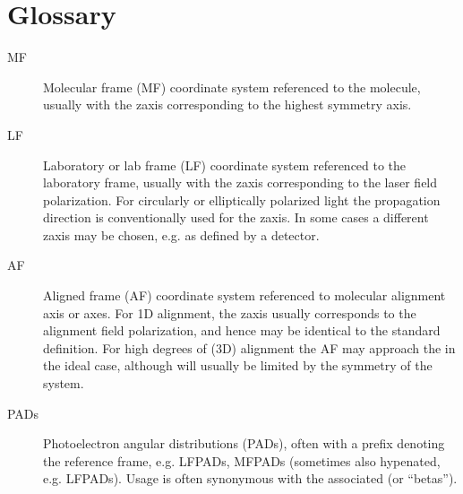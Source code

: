 \documentclass[letterpaper,table,10pt,english]{jupyterBook}
\begin{document}
\chapter{Glossary}
\label{\detokenize{backmatter/glossary:glossary}}\label{\detokenize{backmatter/glossary::doc}}\begin{description}
\item[{MF\label{\detokenize{backmatter/glossary:term-MF}}}] \leavevmode
\sphinxAtStartPar
Molecular frame (MF) \sphinxhyphen{} coordinate system referenced to the molecule, usually with the z\sphinxhyphen{}axis corresponding to the highest symmetry axis.

\item[{LF\label{\detokenize{backmatter/glossary:term-LF}}}] \leavevmode
\sphinxAtStartPar
Laboratory or lab frame (LF) \sphinxhyphen{} coordinate system referenced to the laboratory frame, usually with the z\sphinxhyphen{}axis corresponding to the laser field polarization. For circularly or elliptically polarized light the propagation direction is conventionally used for the z\sphinxhyphen{}axis. In some cases a different z\sphinxhyphen{}axis may be chosen, e.g. as defined by a detector.

\item[{AF\label{\detokenize{backmatter/glossary:term-AF}}}] \leavevmode
\sphinxAtStartPar
Aligned frame (AF) \sphinxhyphen{} coordinate system referenced to molecular alignment axis or axes. For 1D alignment, the z\sphinxhyphen{}axis usually corresponds to the alignment field polarization, and hence may be identical to the standard {\hyperref[\detokenize{backmatter/glossary:term-LF}]{}} definition. For high degrees of (3D) alignment the AF may approach the {\hyperref[\detokenize{backmatter/glossary:term-MF}]{}} in the ideal case, although will usually be limited by the symmetry of the system.

\item[{PADs\label{\detokenize{backmatter/glossary:term-PADs}}}] \leavevmode
\sphinxAtStartPar
Photoelectron angular distributions (PADs), often with a prefix denoting the reference frame, e.g. LFPADs, MFPADs (sometimes also hypenated, e.g. LF\sphinxhyphen{}PADs). Usage is often synonymous with the associated {\hyperref[\detokenize{backmatter/glossary:term-anisotropy-paramters}]{}} (or “betas”).


\end{description}
\end{document}
